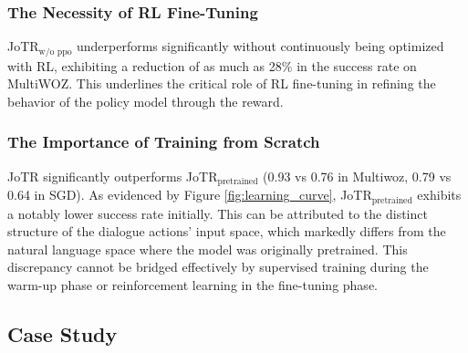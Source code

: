 \documentclass[letterpaper]{article} %
\begin{document}
\subsubsection{The Necessity of RL Fine-Tuning}  JoTR$_\text{w/o ppo}$ underperforms significantly without continuously being optimized with RL, exhibiting a reduction of as much as 28\% in the success rate on MultiWOZ. This underlines the critical role of RL fine-tuning in refining the behavior of the policy model through the reward.

\subsubsection{The Importance of Training from Scratch} JoTR significantly outperforms JoTR$_\text{pretrained}$ (0.93 vs 0.76 in Multiwoz, 0.79 vs 0.64 in SGD). 
As evidenced by Figure \ref{fig:learning_curve}, JoTR$_\text{pretrained}$ exhibits a notably lower success rate initially. This can be attributed to the distinct structure of the dialogue actions' input space, which markedly differs from the natural language space where the model was originally pretrained. 
This discrepancy cannot be bridged effectively by supervised training during the warm-up phase or reinforcement learning in the fine-tuning phase.



\subsection{Case Study} \label{sec:case_study}
\end{document}

